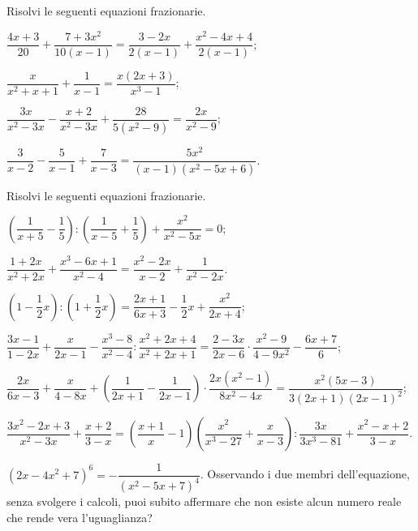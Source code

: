 \begin{esercizio}[\Ast]
\label{ese:18.17}
Risolvi le seguenti equazioni frazionarie.
\begin{enumeratea}
 \item $\dfrac{4x+3}{20}+\dfrac{7+3x^{2}}{10(x-1)}=\dfrac{3-2x}{2(x-1)}+\dfrac{x^{2}-4x+4}{2(x-1)}$;
 \item $\dfrac{x}{x^{2}+x+1}+\dfrac{1}{x-1}=\dfrac{x(2x+3)}{x^{3}-1}$;
 \item $\dfrac{3x}{x^{2}-3x}-\dfrac{x+2}{x^{2}-3x}+\dfrac{28}{5\left(x^{2}-9\right)}=\dfrac{2x}{x^{2}-9}$;
 \item $\dfrac{3}{x-2}-\dfrac{5}{x-1}+\dfrac{7}{x-3}=\dfrac{5x^{2}}{(x-1)\left(x^{2}-5x+6\right)}$.
\end{enumeratea}
\end{esercizio}

\begin{esercizio}[\Ast]
\label{ese:18.18}
Risolvi le seguenti equazioni frazionarie.
\begin{enumeratea}
 \item $\left(\dfrac{1}{x+5}-\dfrac{1}{5}\right):\left(\dfrac{1}{x-5}+\dfrac{1}{5}\right)+\dfrac{x^{2}}{x^{2}-5x}=0$;
 \item $\dfrac{1+2x}{x^{2}+2x}+\dfrac{x^{3}-6x+1}{x^{2}-4}=\dfrac{x^{2}-2x}{x-2}+\dfrac{1}{x^{2}-2x}$.
 \item $\left(1-\dfrac{1}{2}x\right):\left(1+\dfrac{1}{2}x\right)=\dfrac{2x+1}{6x+3}-\dfrac{1}{2}x+\dfrac{x^{2}}{2x+4}$;
 \item $\dfrac{3x-1}{1-2x}+\dfrac{x}{2x-1}-\dfrac{x^{3}-8}{x^{2}-4}:\dfrac{x^{2}+2x+4}{x^{2}+2x+1}=\dfrac{2-3x}{2x-6}\cdot {\dfrac{x^{2}-9}{4-9x^{2}}}-\dfrac{6x+7}{6}$;
 \item $\dfrac{2x}{6x-3}+\dfrac{x}{4-8x}+\left(\dfrac{1}{2x+1}-\dfrac{1}{2x-1}\right)\cdot {\dfrac{2x\left(x^{2}-1\right)}{8x^{2}-4x}}=\dfrac{x^{2}(5x-3)}{3(2x+1)(2x-1)^{2}}$;
 \item $\dfrac{3x^{2}-2x+3}{x^{2}-3x}+\dfrac{x+2}{3-x}=\left(\dfrac{x+1}{x}-1\right)\left(\dfrac{x^{2}}{x^{3}-27}+\dfrac{x}{x-3}\right):\dfrac{3x}{3x^{3}-81}+\dfrac{x^{2}-x+2}{3-x}$.
\end{enumeratea}
\end{esercizio}

\begin{esercizio}
\label{ese:18.19}
$\left(2x-4x^{2}+7\right)^{6}=-{\dfrac{1}{\left(x^{2}-5x+7\right)^{4}}}$. Osservando i due membri dell'equazione, senza svolgere i calcoli, puoi subito affermare che non esiste alcun numero reale che rende
vera l'uguaglianza?
\end{esercizio}

